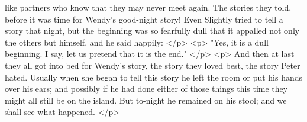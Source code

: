       like partners who know that they may never meet again. The stories they
      told, before it was time for Wendy's good-night story! Even Slightly tried
      to tell a story that night, but the beginning was so fearfully dull that
      it appalled not only the others but himself, and he said happily:
    </p>
    <p>
      "Yes, it is a dull beginning. I say, let us pretend that it is the end."
    </p>
    <p>
      And then at last they all got into bed for Wendy's story, the story they
      loved best, the story Peter hated. Usually when she began to tell this
      story he left the room or put his hands over his ears; and possibly if he
      had done either of those things this time they might all still be on the
      island. But to-night he remained on his stool; and we shall see what
      happened.
    </p>
